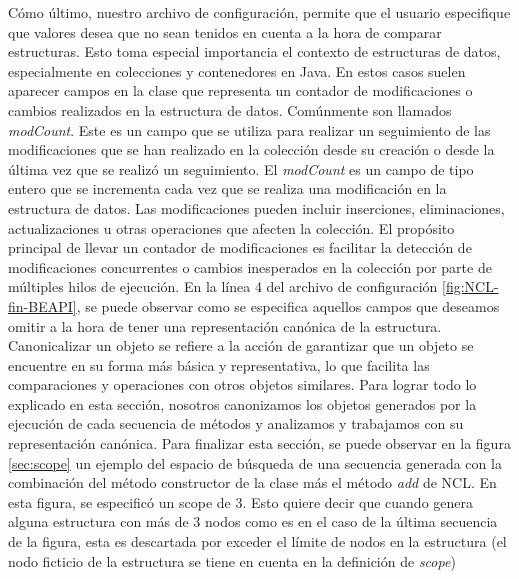 Cómo último, nuestro archivo de configuración, permite que el usuario especifique que valores desea que no sean tenidos en cuenta a la hora de comparar estructuras. 
Esto toma especial importancia el contexto de estructuras de datos, especialmente en colecciones y contenedores en Java. En estos casos suelen aparecer campos en la clase que representa un contador de modificaciones o cambios realizados en la estructura de datos. Comúnmente son llamados \emph{modCount}. Este es un campo que se utiliza para realizar un seguimiento de las modificaciones que se han realizado en la colección desde su creación o desde la última vez que se realizó un seguimiento. El \emph{modCount} es un campo de tipo entero que se incrementa cada vez que se realiza una modificación en la estructura de datos. Las modificaciones pueden incluir inserciones, eliminaciones, actualizaciones u otras operaciones que afecten la colección. El propósito principal de llevar un contador de modificaciones es facilitar la detección de modificaciones concurrentes o cambios inesperados en la colección por parte de múltiples hilos de ejecución. En la línea 4 del archivo de configuración \ref{fig:NCL-fin-BEAPI}, se puede observar como se especifica aquellos campos que deseamos omitir a la hora de tener una representación canónica de la estructura. Canonicalizar un objeto se refiere a la acción de garantizar que un objeto se encuentre en su forma más básica y representativa, lo que facilita las comparaciones y operaciones con otros objetos similares.
Para lograr todo lo explicado en esta sección, nosotros canonizamos los objetos generados por la ejecución de cada secuencia de métodos y analizamos y trabajamos con su representación canónica.
Para finalizar esta sección, se puede observar en la figura \ref{sec:scope} un ejemplo del espacio de búsqueda de una secuencia generada con la combinación del método constructor de la clase más el método \emph{add} de NCL. En esta figura, se especificó un scope de 3. Esto quiere decir que cuando genera alguna estructura con más de 3 nodos como es en el caso de la última secuencia de la figura, esta es descartada por exceder el límite de nodos en la estructura (el nodo ficticio de la estructura se tiene en cuenta en la definición de \emph{scope})


